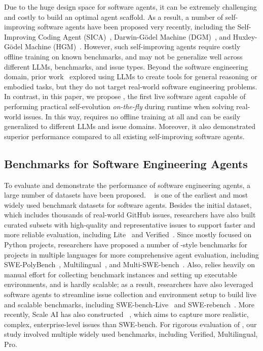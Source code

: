 Due to the huge design space for software agents, it can be extremely challenging and costly to build an optimal agent scaffold. As a result, a number of self-improving software agents have been proposed very recently, including the Self-Improving Coding Agent (SICA)~\citep{robeyns2025sica}, Darwin-Gödel Machine (DGM)~\citep{zhang2025darwin}, and Huxley-Gödel Machine (HGM)~\citep{wang2025huxley}. However, such self-improving agents require costly offline training on known benchmarks, and may not be generalize well across different LLMs, benchmarks, and issue types.
Beyond the software engineering domain, prior work~\cite{llmastool, wang2024voyager, qiu2025alitageneralistagentenabling, qian2024creatortoolcreationdisentangling, wang2024troveinducingverifiableefficient} explored using LLMs to create tools for general reasoning or embodied tasks, but they do not target real-world software engineering problems.
In contrast, in this paper, we propose \livesweagent, the first live software agent capable of performing practical self-evolution \emph{on-the-fly} during runtime when solving real-world issues. In this way, \livesweagent requires no offline training at all and can be easily generalized to different LLMs and issue domains. Moreover, it also demonstrated superior performance compared to all existing self-improving software agents. 


\subsection{Benchmarks for Software Engineering Agents}

To evaluate and demonstrate the performance of software engineering agents, a large number of datasets have been proposed. \swebench~\citep{jimenez2023swe} is one of the earliest and most widely used benchmark datasets for software agents. Besides the initial \swebench dataset, which includes thousands of real-world GitHub issues, researchers have also built curated subsets with high-quality and representative issues to support faster and more reliable evaluation, including \swebench Lite~\citep{jimenez2023swe} and \swebench Verified~\citep{sbv}. Since \swebench mostly focused on Python projects, researchers have proposed a number of \swebench-style benchmarks for projects in multiple languages for more comprehensive agent evaluation, including SWE-PolyBench~\citep{rashid2025swe}, \swebench Multilingual~\citep{sbm}, and Multi-SWE-bench~\citep{zan2025multi}. Also, \swebench relies heavily on manual effort for
collecting benchmark instances and setting up executable environments, and is hardly scalable; as a result, researchers have also leveraged software agents to streamline issue collection and environment setup to build live and scalable benchmarks, including SWE-bench-Live~\citep{zhang2025swe} and SWE-rebench~\cite{badertdinov2025swe}. More recently, Scale AI has also constructed \swebenchpro~\citep{deng2025swe}, which aims to capture more realistic, complex, enterprise-level issues than SWE-bench. For rigorous evaluation of \livesweagent, our study involved multiple widely used benchmarks, including \swebench Verified, \swebench Multilingual, \swebench Pro.

